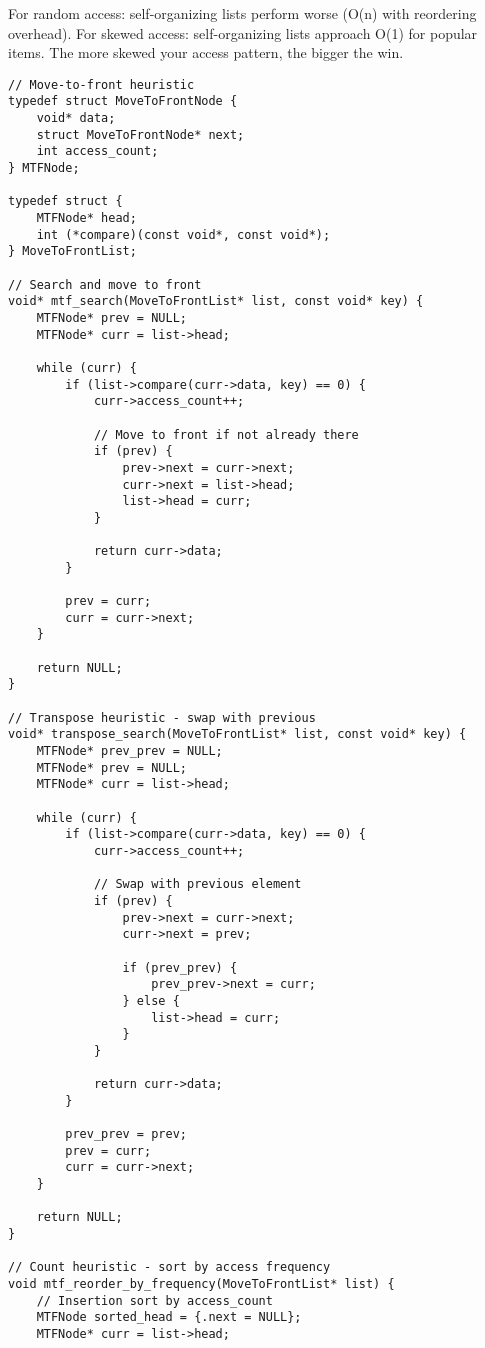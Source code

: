 For random access: self-organizing lists perform worse (O(n) with reordering overhead).
For skewed access: self-organizing lists approach O(1) for popular items.
The more skewed your access pattern, the bigger the win.

\begin{lstlisting}
// Move-to-front heuristic
typedef struct MoveToFrontNode {
    void* data;
    struct MoveToFrontNode* next;
    int access_count;
} MTFNode;

typedef struct {
    MTFNode* head;
    int (*compare)(const void*, const void*);
} MoveToFrontList;

// Search and move to front
void* mtf_search(MoveToFrontList* list, const void* key) {
    MTFNode* prev = NULL;
    MTFNode* curr = list->head;

    while (curr) {
        if (list->compare(curr->data, key) == 0) {
            curr->access_count++;

            // Move to front if not already there
            if (prev) {
                prev->next = curr->next;
                curr->next = list->head;
                list->head = curr;
            }

            return curr->data;
        }

        prev = curr;
        curr = curr->next;
    }

    return NULL;
}

// Transpose heuristic - swap with previous
void* transpose_search(MoveToFrontList* list, const void* key) {
    MTFNode* prev_prev = NULL;
    MTFNode* prev = NULL;
    MTFNode* curr = list->head;

    while (curr) {
        if (list->compare(curr->data, key) == 0) {
            curr->access_count++;

            // Swap with previous element
            if (prev) {
                prev->next = curr->next;
                curr->next = prev;

                if (prev_prev) {
                    prev_prev->next = curr;
                } else {
                    list->head = curr;
                }
            }

            return curr->data;
        }

        prev_prev = prev;
        prev = curr;
        curr = curr->next;
    }

    return NULL;
}

// Count heuristic - sort by access frequency
void mtf_reorder_by_frequency(MoveToFrontList* list) {
    // Insertion sort by access_count
    MTFNode sorted_head = {.next = NULL};
    MTFNode* curr = list->head;


\end{lstlisting}
